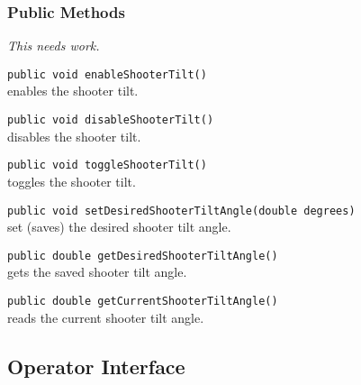 \documentclass[]{article}
\begin{document}
\subsubsection{Public Methods}

\emph{This needs work.}

\noindent
\lstinline[]|public void enableShooterTilt()| \\
enables the shooter tilt.

\noindent
\lstinline[]|public void disableShooterTilt()| \\
disables the shooter tilt.

\noindent
\lstinline[]|public void toggleShooterTilt()| \\
toggles the shooter tilt.

\noindent
\lstinline[]|public void setDesiredShooterTiltAngle(double degrees)| \\
set (saves) the desired shooter tilt angle.

\noindent
\lstinline[]|public double getDesiredShooterTiltAngle()| \\
gets the saved shooter tilt angle.

\noindent
\lstinline[]|public double getCurrentShooterTiltAngle()| \\
reads the current shooter tilt angle.


\subsection{Operator Interface}
\end{document}
